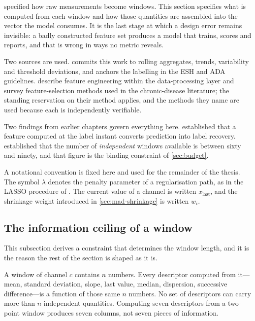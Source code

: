 \documentclass[12pt,a4paper,oneside]{report}
\begin{document}
 specified how raw measurements become windows. This section specifies what is computed from each window and how those quantities are assembled into the vector the model consumes. It is the last stage at which a design error remains invisible: a badly constructed feature set produces a model that trains, scores and reports, and that is wrong in ways no metric reveals.

Two sources are used. \Textcite{cadrage2026} commits this work to rolling aggregates, trends, variability and threshold deviations, and anchors the labelling in the ESH and ADA guidelines. \Textcite{liu2025review} describe feature engineering within the data-processing layer and survey feature-selection methods used in the chronic-disease literature; the standing reservation on their method applies, and the methods they name are used because each is independently verifiable.

Two findings from earlier chapters govern everything here.  established that a feature computed at the label instant converts prediction into label recovery.  established that the number of \emph{independent} windows available is between sixty and ninety, and that figure is the binding constraint of \cref{sec:budget}.

A notational convention is fixed here and used for the remainder of the thesis. The symbol $\lambda$ denotes the penalty parameter of a regularisation path, as in the LASSO procedure of \textcite{mendoza2025}. The current value of a channel is written $x_{\text{last}}$, and the shrinkage weight introduced in \cref{sec:mad-shrinkage} is written $w_i$.

\subsection{The information ceiling of a window}\label{sec:ceiling}

This subsection derives a constraint that determines the window length, and it is the reason the rest of the section is shaped as it is.

A window of channel $c$ contains $n$ numbers. Every descriptor computed from it---mean, standard deviation, slope, last value, median, dispersion, successive difference---is a function of those same $n$ numbers. No set of descriptors can carry more than $n$ independent quantities. Computing seven descriptors from a two-point window produces seven columns, not seven pieces of information.
\end{document}
